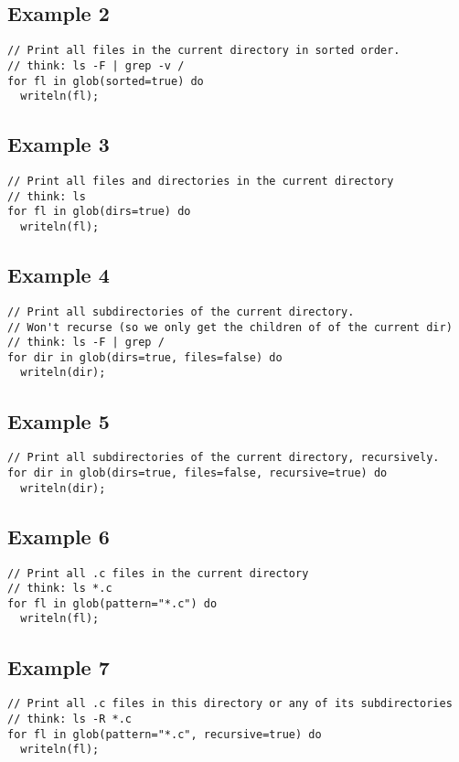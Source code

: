 \documentclass{article}
\begin{document}
\subsection{Example 2}
\begin{lstlisting}
// Print all files in the current directory in sorted order.
// think: ls -F | grep -v /
for fl in glob(sorted=true) do
  writeln(fl);
\end{lstlisting}

\subsection{Example 3}
\begin{lstlisting}
// Print all files and directories in the current directory
// think: ls
for fl in glob(dirs=true) do
  writeln(fl);
\end{lstlisting}

\subsection{Example 4}
\begin{lstlisting}
// Print all subdirectories of the current directory.
// Won't recurse (so we only get the children of of the current dir)
// think: ls -F | grep /
for dir in glob(dirs=true, files=false) do
  writeln(dir);
\end{lstlisting}

\subsection{Example 5}
\begin{lstlisting}
// Print all subdirectories of the current directory, recursively.
for dir in glob(dirs=true, files=false, recursive=true) do
  writeln(dir);
\end{lstlisting}

\subsection{Example 6}
\begin{lstlisting}
// Print all .c files in the current directory
// think: ls *.c
for fl in glob(pattern="*.c") do
  writeln(fl);
\end{lstlisting}

\subsection{Example 7}
\begin{lstlisting}
// Print all .c files in this directory or any of its subdirectories
// think: ls -R *.c
for fl in glob(pattern="*.c", recursive=true) do
  writeln(fl);
\end{lstlisting}
\end{document}

